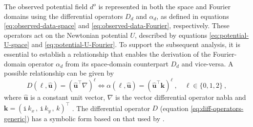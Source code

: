 \documentclass[manuscript,noblind]{geophysics}
\begin{document}
	The observed potential field $d^{o}$ is represented in both the space and Fourier 
	domains using the differential operators $D_{d}$ and $\alpha_{d}$, as defined in equations 
	\ref{eq:observed-data-space} and \ref{eq:observed-data-Fourier}, respectively. 
	These operators act on the Newtonian potential $U$, described by equations 
	\ref{eq:potential-U-space} and \ref{eq:potential-U-Fourier}. To support the subsequent analysis, 
	it is essential to establish a relationship that enables the derivation of the Fourier-domain 
	operator $\alpha_{d}$ from its space-domain counterpart $D_{d}$ and vice-versa.  
	A possible relationship can be given by
	\begin{equation}
		D(\ell, \hat{\mathbf{u}}) = 
		\left( \hat{\mathbf{u}}^{\top} \nabla \right)^{\ell} \Leftrightarrow
		\alpha(\ell, \hat{\mathbf{u}}) = \left( \hat{\mathbf{u}}^{\top} \mathbf{k} \right)^{\ell} \: ,
		\quad \ell \in \{ 0, 1, 2 \} \: ,
		\label{eq:diff-operators-generic}
	\end{equation}
	where $\hat{\mathbf{u}}$ is a constant unit vector,
	$\nabla$ is the vector differential operator nabla \citep[e.g.,][ p. 179]{kaplan2002} and 
	$\mathbf{k} = ( \mathtt{i} \, k_{x} \, , \, \mathtt{i} \, k_{y} \, , \, k)^{\top}$
	\citep{pedersen1978}.
	The differential operator $D$ (equation \ref{eq:diff-operators-generic})
	has a symbolic form based on that used by \citet[][ p. 179]{kaplan2002}.
	
\end{document}
